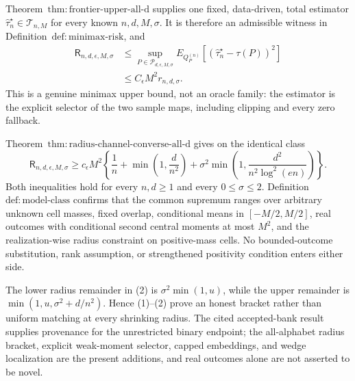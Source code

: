 Theorem~\(\mathrm{thm:frontier\text{-}upper\text{-}all\text{-}d}\) supplies one fixed, data-driven, total estimator \(\widehat\tau_n^{\star}\in\mathcal T_{n,M}\) for every known \(n,d,M,\sigma\).  It is therefore an admissible witness in Definition~\(\mathrm{def:minimax\text{-}risk}\), and
\[
\begin{aligned}
 \mathsf R_{n,d,\epsilon,M,\sigma}
 &\le \sup_{P\in\mathcal P_{d,\epsilon,M,\sigma}}
 E_{Q_P^{(n)}}[(\widehat\tau_n^{\star}-\tau(P))^2]\\
 &\le C_{\epsilon}M^2r_{n,d,\sigma}.
\end{aligned}
\tag{1}
\]
This is a genuine minimax upper bound, not an oracle family: the estimator is the explicit selector of the two sample maps, including clipping and every zero fallback.

Theorem~\(\mathrm{thm:radius\text{-}channel\text{-}converse\text{-}all\text{-}d}\) gives on the identical class
\[
 \mathsf R_{n,d,\epsilon,M,\sigma}
 \ge c_{\epsilon}M^2\left\{\frac1n+\min\left(1,\frac d{n^2}\right)
 +\sigma^2\min\left(1,\frac{d^2}{n^2\log^2(en)}\right)\right\}.
\tag{2}
\]
Both inequalities hold for every \(n,d\ge1\) and every \(0\le\sigma\le2\).  Definition~\(\mathrm{def:model\text{-}class}\) confirms that the common supremum ranges over arbitrary unknown cell masses, fixed overlap, conditional means in \([-M/2,M/2]\), real outcomes with conditional second central moments at most \(M^2\), and the realization-wise radius constraint on positive-mass cells.  No bounded-outcome substitution, rank assumption, or strengthened positivity condition enters either side.

The lower radius remainder in (2) is \(\sigma^2\min(1,u)\), while the upper remainder is \(\min(1,u,\sigma^2+d/n^2)\).  Hence (1)--(2) prove an honest bracket rather than uniform matching at every shrinking radius.  The cited accepted-bank result supplies provenance for the unrestricted binary endpoint; the all-alphabet radius bracket, explicit weak-moment selector, capped embeddings, and wedge localization are the present additions, and real outcomes alone are not asserted to be novel.